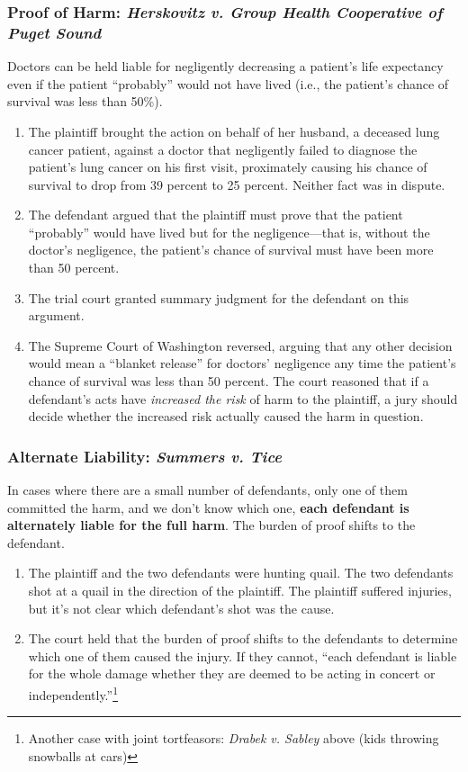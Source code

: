 \subsubsection{Proof of Harm: \emph{Herskovitz v. Group Health Cooperative of Puget Sound}}

Doctors can be held liable for negligently decreasing a patient's life 
expectancy even if the patient ``probably'' would not have lived (i.e., the 
patient's chance of survival was less than 50\%).

\begin{enumerate}
    \item The plaintiff brought the action on behalf of her husband, a 
    deceased lung cancer patient, against a doctor that negligently failed to 
    diagnose the patient's lung cancer on his first visit, proximately causing 
    his chance of survival to drop from 39 percent to 25 percent. Neither fact 
    was in dispute.
    \item The defendant argued that the plaintiff must prove that 
    the patient ``probably'' would have lived but for the negligence---that 
    is, without the doctor's negligence, the patient's chance of survival must 
    have been more than 50 percent.
    \item The trial court granted summary judgment 
    for the defendant on this argument.
    \item The Supreme Court of Washington 
    reversed, arguing that any other decision would mean a ``blanket release'' 
    for doctors' negligence any time the patient's chance of survival was less 
    than 50 percent. The court reasoned that if a defendant's acts have 
    \emph{increased the risk} of harm to the plaintiff, a jury should decide 
    whether the increased risk actually caused the harm in question.
\end{enumerate}

\subsubsection{Alternate Liability: \emph{Summers v. Tice}}

In cases where there are a small number of defendants, only one of them 
committed the harm, and we don't know which one, \textbf{each defendant is 
alternately liable for the full harm}. The burden of proof shifts to the 
defendant.

\begin{enumerate}
    \item The plaintiff and the two defendants were hunting quail. The two 
    defendants shot at a quail in the direction of the plaintiff. The 
    plaintiff suffered injuries, but it's not clear which defendant's shot was 
    the cause.
    \item The court held that the burden of proof shifts to the defendants to determine which one of them caused the injury. If 
    they cannot, ``each defendant is liable for the whole damage whether they 
    are deemed to be acting in concert or independently.''\footnote{Another 
    case with joint tortfeasors: \emph{Drabek v. Sabley} above (kids throwing 
    snowballs at cars)}
\end{enumerate}

